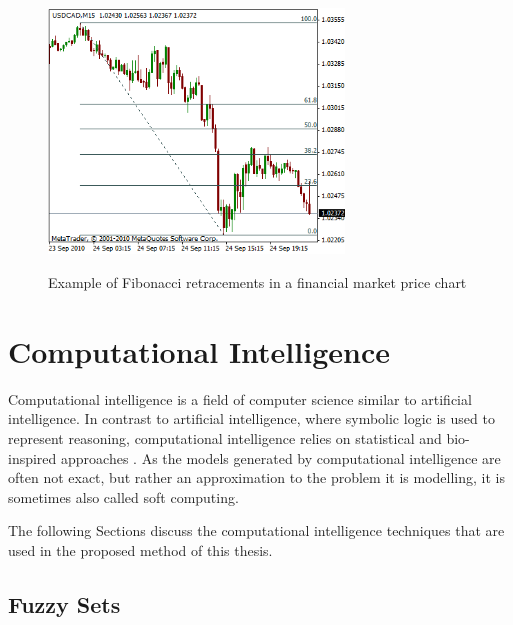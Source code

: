 
\begin{figure}
\caption{Example of Fibonacci retracements in a financial market price chart}
\centering
\includegraphics[width=0.7\textwidth]{img/fibonacci-retracements.png}
\label{figure:fibonacci-retracements-in-financial-market}
\end{figure}

\section{Computational Intelligence}
\label{section:computational-intelligence}

Computational intelligence is a field of computer science similar to artificial
intelligence. In contrast to artificial intelligence, where symbolic logic is
used to represent reasoning, computational intelligence relies on statistical
and bio-inspired approaches
\cite{JangJyh-ShingRogerandSunChuen-TsaiandMizutaniEijiandHo1998}. As the models
generated by computational intelligence are often not exact, but rather an
approximation to the problem it is modelling, it is sometimes also called soft
computing.

The following Sections discuss the computational intelligence techniques that
are used in the proposed method of this thesis.

\subsection{Fuzzy Sets}
\label{subsection:fuzzy-sets}

